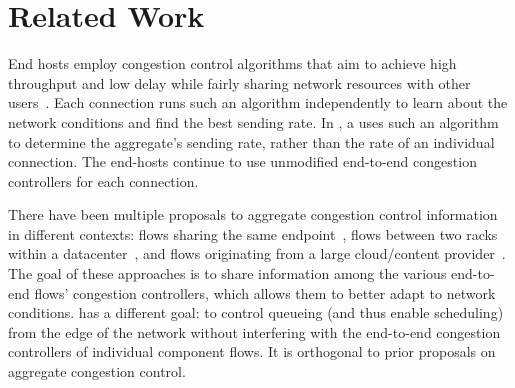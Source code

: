 \section{Related Work}
\label{s:related}


End hosts employ congestion control algorithms that aim to achieve high throughput and low delay while fairly sharing network resources with other users~\cite{Jacobson88}. 
Each connection runs such an algorithm independently to learn about the network conditions and find the best sending rate.
In \name, a \inbox uses such an algorithm to determine the aggregate's sending rate, rather than the rate of an individual connection. 
The end-hosts continue to use unmodified end-to-end congestion controllers for each connection.

There have been multiple proposals to aggregate congestion control information in different contexts: flows sharing the same endpoint~\cite{cm}, flows between two racks within a datacenter~\cite{rackcc}, and flows originating from a large cloud/content provider~\cite{fivecomps}. 
The goal of these approaches is to share information among the various end-to-end flows' congestion controllers, which allows them to better adapt to network conditions. 
\name has a different goal: to control queueing (and thus enable scheduling) from the edge of the network without interfering with the end-to-end congestion controllers of individual component flows. It is orthogonal to prior proposals on aggregate congestion control.


